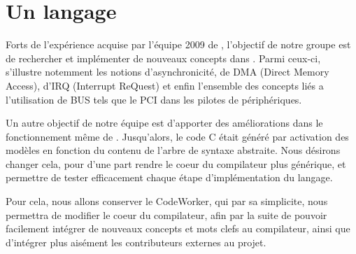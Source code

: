\documentclass{rtxreport}
\begin{document}
\section{Un langage}

Forts de l'expérience acquise par l'équipe 2009 de \rtx, l'objectif de
notre groupe est de rechercher et implémenter de nouveaux concepts dans
\rtx. Parmi ceux-ci, s'illustre notemment les notions d'asynchronicité,
de DMA (Direct Memory Access), d'IRQ (Interrupt ReQuest) et enfin l'ensemble
des concepts liés a l'utilisation de BUS tels que le PCI dans les pilotes de
périphériques.

Un autre objectif de notre équipe est d'apporter des améliorations dans le
fonctionnement même de \rtx. Jusqu'alors, le code C était généré par
activation des modèles en fonction du contenu de l'arbre de syntaxe abstraite.
Nous désirons changer cela, pour d'une part rendre le coeur du compilateur
plus générique, et permettre de tester efficacement chaque étape
d'implémentation du langage.

Pour cela, nous allons conserver le CodeWorker, qui par sa simplicite, nous
permettra de modifier le coeur du compilateur, afin par la suite de pouvoir
facilement intégrer de nouveaux concepts et mots clefs au compilateur,
ainsi que d'intégrer plus aisément les contributeurs externes au projet.
\end{document}
